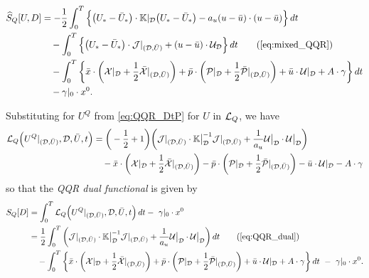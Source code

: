 \documentclass[11pt]{article}
\begin{document}
 \begin{subequations}\label{eq:mixed_QQR}
 \allowdisplaybreaks
 \begin{align}
      \widehat{S}_Q[U,D] & = - \half \int_0^T \Big\{ \big( U_* - \bar{U}_* \big) \cdot \K|_\dee \big( U_* - \bar{U}_* \big) - a_u (u - \bar{u})\cdot (u - \bar{u}) \Big\} \, dt\notag\\
      & \quad - \int_0^T \Big\{ \big( U_* - \bar{U}_* \big) \cdot \mathcal{J}|_{(\dee,\bar{U})} + (u - \bar{u}) \cdot \mathcal{U}_\dee \Big\} \, dt \tag{\ref{eq:mixed_QQR}}\\
      & \quad - \int_0^T \bigg\{ \bar{x} \cdot \left( \calX |_\dee + \half \bar{\calX}|_{(\dee, \bar{U})} \right) + \bar{p} \cdot \left( \calP |_\dee + \half \bar{\calP}|_{(\dee, \bar{U})} \right) + \bar{u} \cdot \calU |_\dee + A \cdot \gamma \bigg\} \, dt \notag\\
      & \quad - \gamma|_0 \cdot x^0. \notag
 \end{align}
 \end{subequations}

 Substituting for $U^Q$ from \eqref{eq:QQR_DtP} for $U$ in $\mathcal{L}_Q$, we have
\begin{equation*}
    \allowdisplaybreaks
    \begin{aligned}
        \scl_Q \Big(U^Q|_{(\dee,\bar{U})},\dee, \bar{U}, t \Big) & = \bigg(- \half + 1 \bigg) \bigg( \mathcal{J}|_{(\dee,\bar{U})} \cdot \K \big|_\dee^{-1} \mathcal{J}|_{(\dee,\bar{U})} + \frac{1}{a_u} \calU \big|_\dee \cdot \calU \big|_\dee \bigg) \notag\\
        & \quad - \bar{x} \cdot \left( \calX |_\dee + \half \bar{\calX}|_{(\dee, \bar{U})} \right) - \bar{p} \cdot \left( \calP |_\dee + \half \bar{\calP}|_{(\dee, \bar{U})} \right) - \bar{u} \cdot \calU |_\dee - A \cdot \gamma
    \end{aligned}
\end{equation*}
so that the \emph{QQR dual functional} is given by
\begin{subequations}
    \label{eq:QQR_dual}
    \begin{align}
        S_Q[D] & = \int_0^T \scl_Q \Big(U^Q|_{(\dee,\bar{U})},\dee, \bar{U}, t \Big) \, dt - \ \gamma|_0 \cdot x^0 \notag\\
        & = \half \int_0^T \bigg( \mathcal{J}|_{(\dee,\bar{U})} \cdot \K \big|_\dee^{-1} \mathcal{J}|_{(\dee,\bar{U})} + \frac{1}{a_u} \calU \big|_\dee \cdot \calU \big|_\dee \bigg) \, dt \tag{\ref{eq:QQR_dual}}\\
        & \quad - \int_0^T \bigg\{ \bar{x} \cdot \left( \calX |_\dee + \half \bar{\calX}|_{(\dee, \bar{U})} \right) + \bar{p} \cdot \left( \calP |_\dee + \half \bar{\calP}|_{(\dee, \bar{U})} \right) + \bar{u} \cdot \calU |_\dee + A \cdot \gamma \bigg\} \, dt \ - \  \gamma|_0 \cdot x^0. \notag
    \end{align}
\end{subequations}
\end{document}
